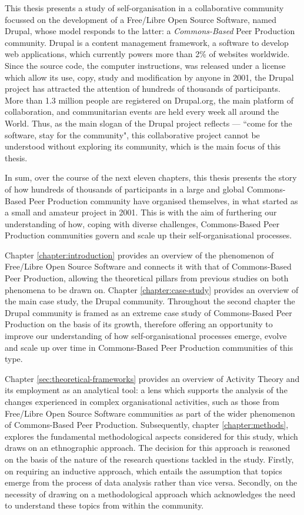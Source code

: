 This thesis presents a study of self-organisation in a collaborative community focussed on the development of a Free/Libre Open Source Software, named Drupal, whose model responds to the latter: a \textit{Commons-Based} Peer Production community. Drupal is a content management framework, a software to develop web applications, which currently powers more than 2\% of websites worldwide. Since the source code, the computer instructions, was released under a license which allow its use, copy, study and modification by anyone in 2001, the Drupal project has attracted the attention of hundreds of thousands of participants. More than 1.3 million people are registered on Drupal.org, the main platform of collaboration, and communitarian events are held every week all around the World. Thus, as the main slogan of the Drupal project reflects --- ``come for the software, stay for the community", this collaborative project cannot be understood without exploring its community, which is the main focus of this thesis.

In sum, over the course of the next eleven chapters, this thesis presents the story of how hundreds of thousands of participants in a large and global Commons-Based Peer Production community have organised themselves, in what started as a small and amateur project in 2001. This is with the aim of furthering our understanding of how, coping with diverse challenges, Commons-Based Peer Production communities govern and scale up their self-organisational processes.

Chapter \ref{chapter:introduction} provides an overview of the phenomenon of Free/Libre Open Source Software and connects it with that of Commons-Based Peer Production, allowing the theoretical pillars from previous studies on both phenomena to be drawn on. Chapter \ref{chapter:case-study} provides an overview of the main case study, the Drupal community. Throughout the second chapter the Drupal community is framed as an extreme case study of Commons-Based Peer Production on the basis of its growth, therefore offering an opportunity to improve our understanding of how self-organisational processes emerge, evolve and scale up over time in Commons-Based Peer Production communities of this type.

Chapter \ref{sec:theoretical-frameworks} provides an overview of Activity Theory and its employment as an analytical tool: a lens which supports the analysis of the changes experienced in complex organisational activities, such as those from Free\slash Libre Open Source Software communities as part of the wider phenomenon of Commons-Based Peer Production. Subsequently, chapter \ref{chapter:methods}, explores the fundamental methodological aspects considered for this study, which draws on an ethnographic approach. The decision for this approach is reasoned on the basis of the nature of the research questions tackled in the study. Firstly, on requiring an inductive approach, which entails the assumption that topics emerge from the process of data analysis rather than vice versa. Secondly, on the necessity of drawing on a methodological approach which acknowledges the need to understand these topics from within the community.

